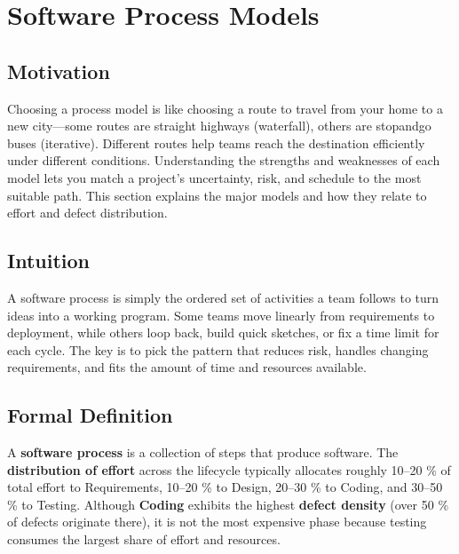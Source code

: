 \documentclass[12pt, a4paper]{article}
\begin{document}
\section{Software Process Models}
\subsection{Motivation}
Choosing a process model is like choosing a route to travel from your home to a new city---some routes are straight highways (waterfall), others are stopandgo buses (iterative).  Different routes help teams reach the destination efficiently under different conditions.  Understanding the strengths and weaknesses of each model lets you match a project's uncertainty, risk, and schedule to the most suitable path.  This section explains the major models and how they relate to effort and defect distribution.

\subsection{Intuition}
A software process is simply the ordered set of activities a team follows to turn ideas into a working program.  Some teams move linearly from requirements to deployment, while others loop back, build quick sketches, or fix a time limit for each cycle.  The key is to pick the pattern that reduces risk, handles changing requirements, and fits the amount of time and resources available.

\subsection{Formal Definition}
A \textbf{software process} is a collection of steps that produce software.  The \textbf{distribution of effort} across the lifecycle typically allocates roughly 10--20 \% of total effort to Requirements, 10--20 \% to Design, 20--30 \% to Coding, and 30--50 \% to Testing.  Although \textbf{Coding} exhibits the highest \textbf{defect density} (over 50 \% of defects originate there), it is not the most expensive phase because testing consumes the largest share of effort and resources.
\end{document}
